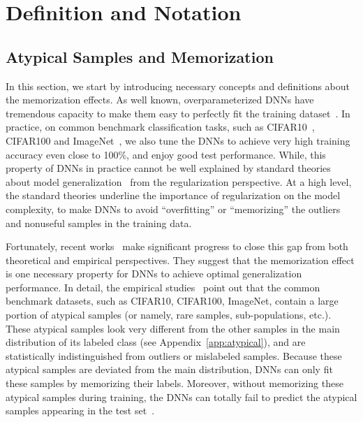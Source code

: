 \vspace{-0.3cm}
\section{Definition and Notation}
\vspace{-0.1cm}
\subsection{Atypical Samples and Memorization}\label{sec:def_atypical}
In this section, we start by introducing necessary concepts and definitions about the memorization effects. As well known, overparameterized DNNs have tremendous capacity to make them easy to perfectly fit the training dataset~\cite{zhang2016understanding}. In practice, on common benchmark classification tasks, such as CIFAR10~\cite{he2016deep}, CIFAR100 and ImageNet~\cite{krizhevsky2012imagenet}, we also tune the DNNs to achieve very high training accuracy even close to 100\%, and enjoy good test performance. While, this property of DNNs in practice cannot be well explained by standard theories about model generalization~\cite{evgeniou2000regularization, bartlett2002rademacher} from the regularization perspective. At a high level, the standard theories underline the importance of regularization on the model complexity, to make DNNs to avoid ``overfitting'' or ``memorizing'' the outliers and nonuseful samples in the training data. 

Fortunately, recent works~\cite{feldman2020does, feldman2020neural,bartlett2020benign, muthukumar2020harmless, chatterji2020finite} make significant progress to close this gap from both theoretical and empirical perspectives. They suggest that the memorization effect is one necessary property for DNNs to achieve optimal generalization performance. In detail, the empirical studies~\cite{feldman2020does, feldman2020neural} point out that the common benchmark datasets, such as CIFAR10, CIFAR100, ImageNet, contain a large portion of atypical samples (or namely, rare samples, sub-populations, etc.). These atypical samples look very different from the other samples in the main distribution of its labeled class (see Appendix~\ref{app:atypical}), and are statistically indistinguished from outliers or mislabeled samples. Because these atypical samples are deviated from the main distribution, DNNs can only fit these samples by memorizing their labels. Moreover, without memorizing these atypical samples during training, the DNNs can totally fail to predict the atypical samples appearing in the test set~\cite{feldman2020neural}.





